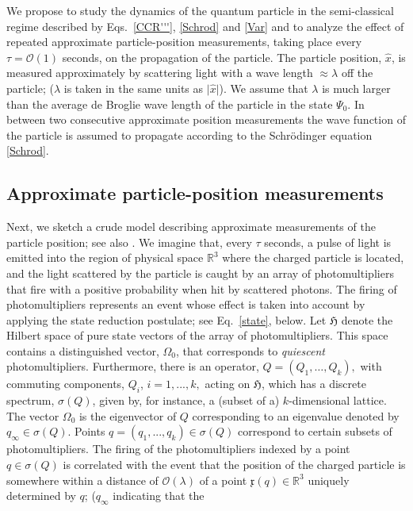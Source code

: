\documentclass[11pt]{article}
\begin{document}
We propose to study the dynamics of the quantum particle in the semi-classical regime described by Eqs.~\eqref{CCR'''}, 
\eqref{Schrod} and \eqref{Var} and to analyze the effect of repeated approximate particle-position measurements, 
taking place every $\tau= \mathcal{O}(1)$ seconds, on the propagation of the particle. The particle position, $\hat{x}$, 
is measured approximately by scattering light with a wave length $\approx \lambda$ off the particle; 
($\lambda$ is taken in the same units as $\vert \hat{x}\vert$). We assume that $\lambda$ is much 
larger than the average de Broglie wave length of the particle in the state $\Psi_0$. In between two consecutive approximate 
position measurements the wave function of the particle is assumed to propagate according to the Schr\"odinger 
equation \eqref{Schrod}.

\subsection{Approximate particle-position measurements}\label{particle position}
Next, we sketch a crude model describing approximate measurements of the particle position; see also \cite{BBFF}.  
We imagine that, every $\tau$ seconds, a pulse of light is emitted into the region of 
physical space $\mathbb{R}^{3}$ where the charged particle is located, and the light scattered by the particle is caught 
by an array of photomultipliers that fire with a positive probability when hit by scattered photons. The firing of 
photomultipliers represents an event whose effect is taken into account by applying the state reduction postulate; 
see Eq.~\eqref{state}, below.  Let $\mathfrak{H}$ denote the Hilbert space of pure state vectors of the array of 
photomultipliers. This space contains a distinguished vector, $\Omega_0$, that corresponds to \textit{quiescent} 
photomultipliers.
Furthermore, there is an operator, $Q=(Q_1, \dots, Q_k),$ with commuting components, $Q_i$, $i=1, ..., k,$ acting 
on $\mathfrak{H}$, which has a discrete spectrum, $\sigma(Q)$, given by, for instance, a (subset of
a) $k$-dimensional lattice. The vector $\Omega_0$ is the eigenvector of $Q$ corresponding to an eigenvalue 
denoted by $q_{\infty} \in \sigma(Q)$. Points $q=(q_1, ..., q_k) \in \sigma(Q)$ correspond to certain subsets of 
photomultipliers. The firing of the photomultipliers indexed by a point $q \in \sigma(Q)$ is correlated with the 
event that the position of the charged particle is somewhere within a distance of $\mathcal{O}(\lambda)$ of 
a point $\mathfrak{x}(q) \in \mathbb{R}^{3}$ uniquely determined by $q$; ($q_{\infty}$ indicating that the
\end{document}
